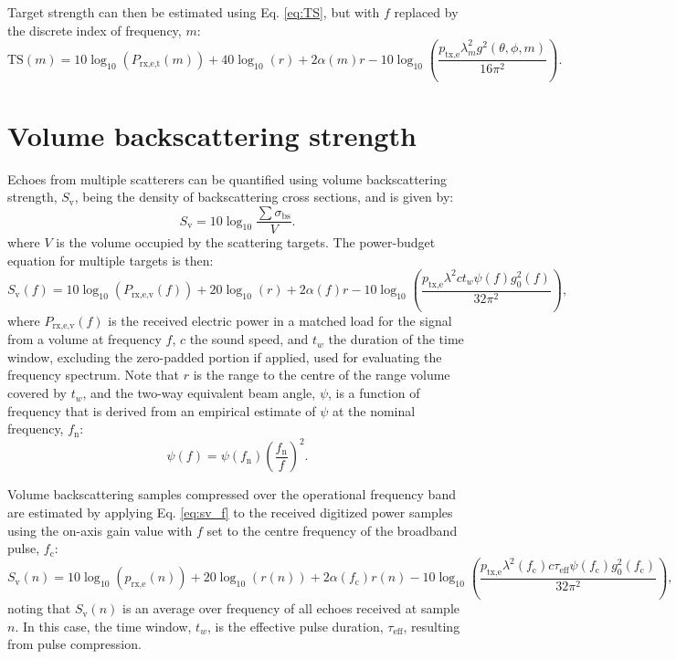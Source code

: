\documentclass[preprint,12pt,TurnOnLineNumbers]{JASAnew}
\newcommand{\freqsym}{f}
\newcommand{\samplesymt}{n}
\newcommand{\samplesymf}{m}
\newcommand{\fc}{f_{\textrm{c}}}
\newcommand{\fn}{f_{\textrm{n}}}
\newcommand{\ptxe}{p_{\textrm{tx,e}}}
\newcommand{\prxe}{p_{\textrm{rx,e}}}
\newcommand{\teff}{\tau_{\textrm{eff}}}
\newcommand{\prxetf}{P_{\textrm{rx,e,t}}}
\newcommand{\prxevf}{P_{\textrm{rx,e,v}}}
\newcommand{\tslide}{t_w}
\newcommand{\bs}{\sigma_{\textrm{bs}}}
\newcommand{\ts}{\textrm{TS}}
\newcommand{\sv}{S_{\textrm{v}}}
\newcommand{\range}{r}
\newcommand{\athw}{\phi}
\newcommand{\along}{\theta}
\newcommand{\gain}{g}
\newcommand{\gainzero}{g_0}
\newcommand{\eqang}{\psi}
\newcommand{\wlen}{\lambda}
\newcommand{\cw}{c}
\newcommand{\absorp}{\alpha}
\begin{document}
Target strength can then be estimated using Eq. \ref{eq:TS}, but with $\freqsym$ replaced by the discrete index of frequency, $\samplesymf$:
\begin{equation}
\label{eq:TS_f}
\ts(\samplesymf) = 10\log_{10}(\prxetf(\samplesymf)) + 40\log_{10}(\range) + 2\absorp(\samplesymf)\range 
- 10\log_{10}\left( \frac{\ptxe \wlen_\samplesymf^2 \gain^2(\along,\athw,\samplesymf)}{16\pi^2} \right).
\end{equation}

\section{Volume backscattering strength}

Echoes from multiple scatterers can be quantified using volume backscattering strength, $\sv$, being the density of backscattering cross sections, and is given by:
%
\begin{equation}
\label{eq:sv}
\sv  =  10\log_{10}\frac{\sum\bs}{V}.
\end{equation}
%
where $V$ is the volume occupied by the scattering targets. The power-budget equation for multiple targets is then:
%
\begin{equation}
\label{eq:sv_f}
\sv(\freqsym) = 10\log_{10}(\prxevf(\freqsym)) + 20\log_{10}(\range) + 2\absorp(\freqsym)\range 
- 10\log_{10}\left( \frac{\ptxe \wlen^2 \cw \tslide \eqang(\freqsym) \gainzero^2(\freqsym)}{32\pi^2} \right), 
\end{equation}
%
where $\prxevf(\freqsym)$ is the received electric power in a matched load for the signal from a volume at frequency $\freqsym$, $\cw$ the sound speed, and $\tslide$ the duration of the time window, excluding the zero-padded portion if applied, used for evaluating the frequency spectrum. Note that $\range$ is the range to the centre of the range volume covered by $\tslide$, and the two-way equivalent beam angle, $\eqang$, is a function of frequency that is derived from an empirical estimate of $\eqang$ at the nominal frequency, $\fn$:
\begin{equation}
\label{eq:PsiFc}
\eqang(f) = \eqang(\fn)\left(\frac{\fn}{f}\right)^2.
\end{equation}

Volume backscattering samples compressed over the operational frequency band are estimated by applying Eq. \ref{eq:sv_f} to the received digitized power samples using the on-axis gain value with $f$ set to the centre frequency of the broadband pulse, $\fc$:
\begin{equation}
\label{eq:Sv}
\sv(\samplesymt)  =  10\log_{10}(\prxe(\samplesymt)) + 20\log_{10}(\range(\samplesymt)) + 2\absorp(\fc)\range(\samplesymt) 
- 10\log_{10}\left( \frac{\ptxe \wlen^2(\fc) \cw \teff \eqang(\fc) \gainzero^2(\fc)}{32\pi^2} \right),
\end{equation}
noting that $\sv(\samplesymt)$ is an average over frequency of all echoes received at sample $\samplesymt$. In this case, the time window, $\tslide$, is the effective pulse duration, $\teff$, resulting from pulse compression.
\end{document}
